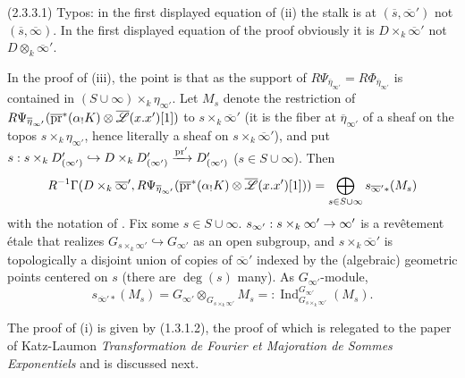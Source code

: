 \documentclass[deligne.tex]{subfiles}
\begin{document}
(2.3.3.1) Typos: in the first displayed equation of (ii) the stalk is at
$(\overline s,\overline\infty')$ not $(\overline s,\overline\infty)$.
In the first displayed equation of the proof obviously it is 
$D\times_k\overline\infty'$ not $D\otimes_k\overline\infty'$.

In the proof of (iii), the point is that as the support of
$R\Psi_{\overline\eta_{\infty'}}=R\Phi_{\overline\eta_{\infty'}}$
is contained in $(S\cup\infty)\times_k\eta_{\infty'}$.
Let $M_s$ denote the restriction of
$R\Psi_{\overline\eta_{\infty'}}(\overline{\operatorname{pr}}^*(\alpha_!K)\otimes\overline{\mathscr L}(x.x')[1])$
to $s\times_k\overline\infty'$
(it is the fiber at $\overline\eta_{\infty'}$ of a sheaf on the topos
$s\times_k\eta_{\infty'}$, hence literally a sheaf on
$s\times_k\overline\infty'$), and put
$s:s\times_kD'_{(\infty')}\hookrightarrow D\times_kD'_{(\infty')}\xrightarrow{\operatorname{pr}'}D'_{(\infty')}$
($s\in S\cup\infty$). Then
\begin{equation*}
	R^{-1}\Gamma(D\times_k\overline\infty',R\Psi_{\overline\eta_{\infty'}}(\overline{\operatorname{pr}}^*(\alpha_!K)\otimes\overline{\mathscr L}(x.x')[1]))
	=\bigoplus_{s\in S\cup\infty}s_{\overline\infty'*}(M_s)
\end{equation*}
with the notation of \cite[2.1.6]{SGA7}. Fix some $s\in S\cup\infty$.
$s_{\infty'}:s\times_k\infty'\rightarrow\infty'$ is a
revêtement étale that realizes
$G_{s\times_k\infty'}\hookrightarrow G_{\infty'}$ as an open subgroup,
and $s\times_k\overline\infty'$ is topologically a disjoint union of copies
of $\overline\infty'$ indexed by the (algebraic) geometric points centered
on $s$ (there are $\deg(s)$ many). As $G_{\infty'}$-module,
\begin{equation*}
	s_{\overline\infty'*}(M_s)
	=G_{\infty'}\otimes_{G_{s\times_k\infty'}}M_s
	=:\operatorname{Ind}^{G_{\infty'}}_{G_{s\times_k\infty'}}(M_s).
\end{equation*}

The proof of (i) is given by (1.3.1.2), the proof of which is relegated to
the paper of Katz-Laumon \emph{Transformation de Fourier et Majoration de
Sommes Exponentiels} and is discussed next.
\end{document}
